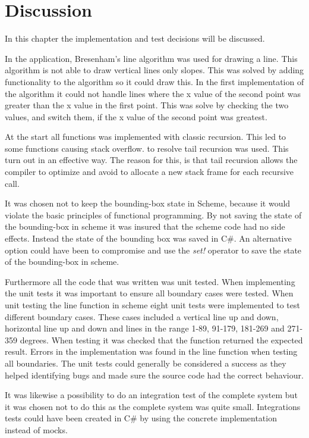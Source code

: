 \chapter{Discussion}
\label{chp:disc}

In this chapter the implementation and test decisions will be discussed. 

In the application, Bresenham’s line algorithm was used for drawing a line. This algorithm is not able to draw vertical lines only slopes. This was solved by adding functionality to the algorithm so it could draw this. In the first implementation of the algorithm it could not handle lines where the x value of the second point was greater than the x value in the first point. This was solve by checking the two values, and switch them, if the x value of the second point was greatest.

At the start all functions was implemented with classic recursion. This led to some functions causing stack overflow. to resolve tail recursion was used. This turn out in an effective way. The reason for this, is that tail recursion allows the compiler to optimize and avoid to allocate a new stack frame for each recursive call. 

It was chosen not to keep the bounding-box state in Scheme, because it would violate the basic principles of functional programming. By not saving the state of the bounding-box in scheme it was insured that the scheme code had no side effects. Instead the state of the bounding box was saved in C\#. An alternative option could have been to compromise and use the \emph{set!} operator to save the state of the bounding-box in scheme.

Furthermore all the code that was written was unit tested. When implementing the unit tests it was important to ensure all boundary cases were tested. When unit testing the line function in scheme eight unit tests were implemented to test different boundary cases. These cases included a vertical line up and down, horizontal line up and down and lines in the range 1-89, 91-179, 181-269 and 271-359 degrees. When testing it was checked that the function returned the expected result. Errors in the implementation was found in the line function when testing all boundaries. The unit tests could generally be considered a success as they helped identifying bugs and made sure the source code had the correct behaviour.

It was likewise a possibility to do an integration test of the complete system but it was chosen not to do this as the complete system was quite small. Integrations tests could have been created in C\# by using the concrete implementation instead of mocks.

